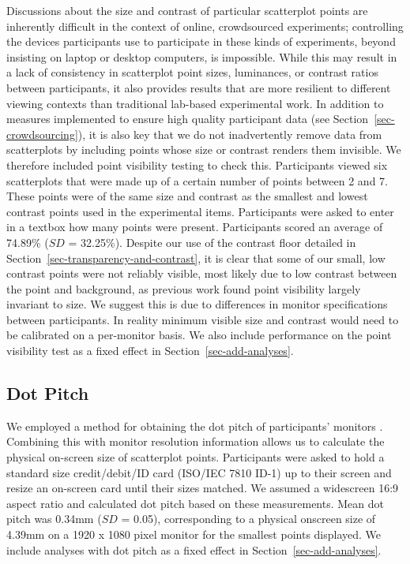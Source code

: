 \documentclass[manuscript, review, anonymous, screen]{acmart}
\begin{document}
Discussions about the size and contrast of particular scatterplot points
are inherently difficult in the context of online, crowdsourced
experiments; controlling the devices participants use to participate in
these kinds of experiments, beyond insisting on laptop or desktop
computers, is impossible. While this may result in a lack of consistency
in scatterplot point sizes, luminances, or contrast ratios between
participants, it also provides results that are more resilient to
different viewing contexts than traditional lab-based experimental work.
In addition to measures implemented to ensure high quality participant
data (see Section~\ref{sec-crowdsourcing}), it is also key that we do
not inadvertently remove data from scatterplots by including points
whose size or contrast renders them invisible. We therefore included
point visibility testing to check this. Participants viewed six
scatterplots that were made up of a certain number of points between 2
and 7. These points were of the same size and contrast as the smallest
and lowest contrast points used in the experimental items. Participants
were asked to enter in a textbox how many points were present.
Participants scored an average of 74.89\% (\(SD\) = 32.25\%). Despite
our use of the contrast floor detailed in
Section~\ref{sec-transparency-and-contrast}, it is clear that some of
our small, low contrast points were not reliably visible, most likely
due to low contrast between the point and background, as previous work
\citep{strain_2023b} found point visibility largely invariant to size.
We suggest this is due to differences in monitor specifications between
participants. In reality minimum visible size and contrast would need to
be calibrated on a per-monitor basis. We also include performance on the
point visibility test as a fixed effect in
Section~\ref{sec-add-analyses}.

\hypertarget{sec-dot-pitch}{%
\subsection{Dot Pitch}\label{sec-dot-pitch}}

We employed a method for obtaining the dot pitch of participants'
monitors \citep{screenscale}. Combining this with monitor resolution
information allows us to calculate the physical on-screen size of
scatterplot points. Participants were asked to hold a standard size
credit/debit/ID card (ISO/IEC 7810 ID-1) up to their screen and resize
an on-screen card until their sizes matched. We assumed a widescreen
16:9 aspect ratio and calculated dot pitch based on these measurements.
Mean dot pitch was 0.34mm (\(SD\) = 0.05), corresponding to a physical
onscreen size of 4.39mm on a 1920 x 1080 pixel monitor for the smallest
points displayed. We include analyses with dot pitch as a fixed effect
in Section~\ref{sec-add-analyses}.
\end{document}
